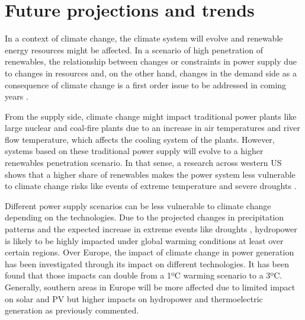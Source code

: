 


\section{Future projections and trends}

    
In a context of climate change, the climate system will evolve and renewable energy resources might be affected. In a scenario of high penetration of renewables, the relationship between changes or constraints in power supply due to changes in resources and, on the other hand, changes in the demand side as a consequence of climate change is a first order issue to be addressed in coming years \cite*{Damm2017, Bloomfield2016}.

From the supply side, climate change might impact traditional power plants like large nuclear and coal-fire plants \cite*{Bartos2015, Troccoli2018} due to an increase in air temperatures and river flow temperature, which affects the cooling system of the plants. However, systems based on these traditional power supply will evolve to a higher renewables penetration scenario. In that sense, a research across western US shows that a higher share of renewables makes the power system less vulnerable to climate change risks like events of extreme temperature and severe droughts \cite*{Bartos2015}.  

Different power supply scenarios can be less vulnerable to climate change depending on the technologies. Due to the projected changes in precipitation patterns \cite*{Dore2005, Gao2006} and the expected increase in extreme events like droughts \cite*{Hoerling2012}, hydropower is likely to be highly impacted under global warming conditions at least over certain regions. Over Europe, the impact of climate change in power generation has been investigated through its impact on different technologies. It has been found that those impacts can double from a 1ºC warming scenario to a 3ºC. Generally, southern areas in Europe will be more affected due to limited impact on solar and PV but higher impacts on hydropower and thermoelectric generation \cite*{Tobin2018} as previously commented.

